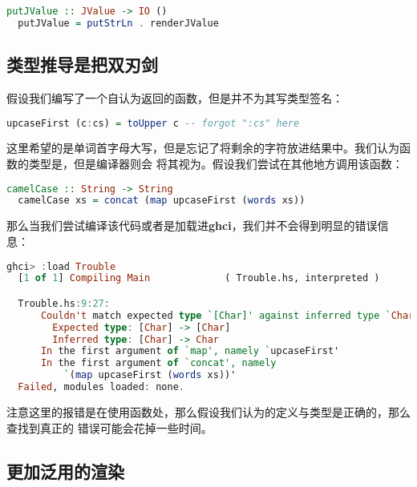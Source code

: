 \documentclass[./main.tex]{subfiles}
\begin{document}
\begin{lstlisting}[language=Haskell]
  putJValue :: JValue -> IO ()
  putJValue = putStrLn . renderJValue
\end{lstlisting}

\subsection*{类型推导是把双刃剑}

假设我们编写了一个自认为返回的函数，但是并不为其写类型签名：

\begin{lstlisting}[language=Haskell]
  upcaseFirst (c:cs) = toUpper c -- forgot ":cs" here
\end{lstlisting}

这里希望的是单词首字母大写，但是忘记了将剩余的字符放进结果中。我们认为函数的类型是，但是编译器则会
将其视为。假设我们尝试在其他地方调用该函数：

\begin{lstlisting}[language=Haskell]
  camelCase :: String -> String
  camelCase xs = concat (map upcaseFirst (words xs))
\end{lstlisting}

那么当我们尝试编译该代码或者是加载进\textbf{ghci}，我们并不会得到明显的错误信息：

\begin{lstlisting}[language=Haskell]
  ghci> :load Trouble
  [1 of 1] Compiling Main             ( Trouble.hs, interpreted )

  Trouble.hs:9:27:
      Couldn't match expected type `[Char]' against inferred type `Char'
        Expected type: [Char] -> [Char]
        Inferred type: [Char] -> Char
      In the first argument of `map', namely `upcaseFirst'
      In the first argument of `concat', namely
          `(map upcaseFirst (words xs))'
  Failed, modules loaded: none.
\end{lstlisting}

注意这里的报错是在使用函数处，那么假设我们认为的定义与类型是正确的，那么查找到真正的
错误可能会花掉一些时间。

\subsection*{更加泛用的渲染}

\end{document}
